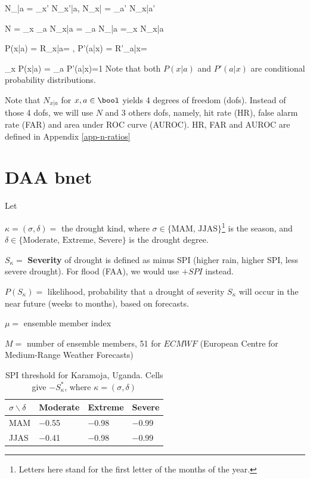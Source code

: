 \documentclass[12pt]{article}
\begin{document}
\beq
N_{|a} = \sum_{x'} N_{x'|a},
\quad
N_{x|} = \sum_{a'} N_{x|a'}
\eeq

\beq
N = \sum_x \sum_a N_{x|a} =
\sum_a N_{|a}
=\sum_x N_{x|a}
\eeq

\beq
P(x|a) = R_{x|a}= 
,\;
P'(a|x) = R'_{a|x}= 
\eeq

\beq
\sum_x P(x|a) =
\sum_a P'(a|x)=1
\eeq
Note that both 
$P(x|a)$
and $P'(a|x)$ 
are
conditional
probability distributions.

Note that $N_{x|a}$
for $x,a\in \bool$
yields 4 degrees of
freedom (dofs).
Instead of those 4  dofs,
we will use $N$
and 3 others dofs,
namely,
hit rate (HR), 
false alarm rate (FAR)
and area under ROC curve (AUROC).
HR, FAR and AUROC
are defined
in Appendix \ref{app-n-ratios}




\section{DAA bnet}


Let

$\kappa=(\sigma, \delta)=$
the drought kind, 
where  $\sigma\in\{\text{MAM, JJAS}\}$\footnote{Letters here stand for the first letter of the months of the year.} is the season, and $\delta\in\{\text{Moderate, Extreme, Severe}\}$
is the drought degree.

$S_\kappa=$ {\bf Severity } of drought is defined as minus SPI (higher rain,
higher SPI, less 
severe drought). 
For flood (FAA), we would
use $+SPI$ instead.

$ P(S_\kappa)=$ likelihood, 
probability  that a drought of severity $S_\kappa$  will occur in the near future (weeks to months), based on forecasts.

$\mu=$ ensemble member index

$M=$ number of ensemble members, 51 for $ECMWF$ (European Centre for Medium-Range Weather Forecasts)



\begin{table}[!h]
\begin{tabular}{|l|l|l|l|}
\hline
$\sigma\backslash\delta$ & \cellcolor[HTML]{FFFFC7}Moderate & \cellcolor[HTML]{FFFFC7}Extreme & \cellcolor[HTML]{FFFFC7}Severe \\ \hline
\cellcolor[HTML]{FFFFC7}MAM & $-$0.55 & $-$0.98 & $-$0.99 \\ \hline
\cellcolor[HTML]{FFFFC7}JJAS & $-$0.41 & $-$0.98 & $-$0.99 \\ \hline
\end{tabular}
\caption{SPI threshold  for Karamoja, Uganda.
Cells give $-S^*_\kappa$,
where $\kappa=(\sigma, \delta)$}
\label{tab-spi-karamoja}
\end{table}
\end{document}
